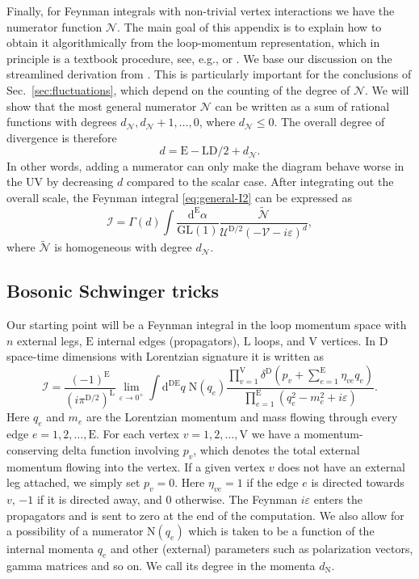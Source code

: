 \documentclass[12pt]{article}
\numberwithin{figure}{section}
\def \be {\begin{equation}}
\def \ee {\end{equation}}
\def \D {\mathrm{D}}
\def \E {\mathrm{E}}
\def \L {\mathrm{L}}
\def \U {\mathcal{U}}
\def \d {\mathrm{d}}
\def \eps {\varepsilon}
\def \V {\mathcal{V}}
\def \leq {\leqslant}
\def \I {\mathcal{I}}
\def \GL {\mathrm{GL}}
\def \N {\mathcal{N}}
\def \NN {\mathrm{N}}
\begin{document}
Finally, for Feynman integrals with non-trivial vertex interactions we have the numerator function $\N$. The main goal of this appendix is to explain how to obtain it algorithmically from the loop-momentum representation, which in principle is a textbook procedure, see, e.g., \cite[Ch.~2]{smirnov1991renormalization} or \cite[Ch.~2]{zavialov2012renormalized}. We base our discussion on the  streamlined derivation from \cite{AHHM}. This is particularly important for the conclusions of Sec.~\ref{sec:fluctuations}, which depend on the counting of the degree of $\N$. We will show that the most general numerator $\N$ can be written as a sum of rational functions with degrees $d_\N, d_\N{+}1, \ldots, 0$, where $d_\N \leq 0$.
The overall degree of divergence is therefore
%
\be
d = \E - \L\D/2 + d_{\N}.
\ee
%
In other words, adding a numerator can only make the diagram behave worse in the UV by decreasing $d$ compared to the scalar case.
After integrating out the overall scale, the Feynman integral \eqref{eq:general-I2} can be expressed as
%
\be\label{eq:I2}
\I = \Gamma(d) \int \frac{\d^{\E}\alpha}{\GL(1)} \frac{\widetilde{\N}}{\U^{\D/2} (-\V-i\eps)^{d}}, 
\ee
%
where $\widetilde{\N}$ is homogeneous with degree $d_{\N}$.


\subsection{Bosonic Schwinger tricks}

Our starting point will be a Feynman integral in the loop momentum space with $n$ external legs, $\E$ internal edges (propagators), $\L$ loops, and $\mathrm{V}$ vertices. In $\D$ space-time dimensions with Lorentzian signature it is written as
%
\be\label{eq:I}
\I =  \frac{(-1)^\E}{(i\pi^{\D/2})^{\L}} \lim_{\eps \to 0^+} \int \d^{\D\E} q\; \NN(q_e) \frac{\prod_{v=1}^{\mathrm{V}} \delta^\D(p_v + \sum_{e=1}^{\E} \eta_{ve} q_e) }{\prod_{e=1}^{\E} (q_e^2 - m_e^2 + i\eps)}.
\ee
%
Here $q_e$ and $m_e$ are the Lorentzian momentum and mass flowing through every edge $e= 1, 2, \ldots, \E$. For each vertex $v = 1,2,\ldots,\mathrm{V}$ we have a momentum-conserving delta function involving $p_v$, which denotes the total external momentum flowing into the vertex. If a given vertex $v$ does not have an external leg attached, we simply set $p_v = 0$. Here $\eta_{ve} = 1$ if the edge $e$ is directed towards $v$, $-1$ if it is directed away, and $0$ otherwise. The Feynman $i\eps$ enters the propagators and is sent to zero at the end of the computation. We also allow for a possibility of a numerator $\NN(q_e)$ which is taken to be a function of the internal momenta $q_e$ and other (external) parameters such as polarization vectors, gamma matrices and so on. We call its degree in the momenta $d_\NN$.
\end{document}
